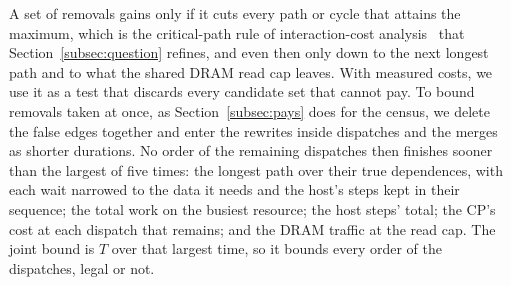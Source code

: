 A set of removals gains only if it cuts every path or cycle that attains the maximum, which is the critical-path rule of interaction-cost analysis~\citep{fields2003interaction} that Section~\ref{subsec:question} refines, and even then only down to the next longest path and to what the shared DRAM read cap leaves.
With measured costs, we use it as a test that discards every candidate set that cannot pay.
To bound removals taken at once, as Section~\ref{subsec:pays} does for the census, we delete the false edges together and enter the rewrites inside dispatches and the merges as shorter durations.
No order of the remaining dispatches then finishes sooner than the largest of five times: the longest path over their true dependences, with each wait narrowed to the data it needs and the host's steps kept in their sequence; the total work on the busiest resource; the host steps' total; the CP's cost at each dispatch that remains; and the DRAM traffic at the read cap.
The joint bound is $T$ over that largest time, so it bounds every order of the dispatches, legal or not.
